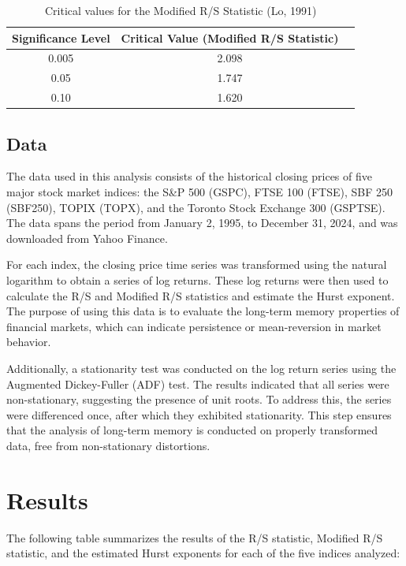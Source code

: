\documentclass[11pt]{extarticle}
\begin{document}
\begin{table}[ht!]
\centering
\begin{tabular}{|c|c|c|}
\hline
\textbf{Significance Level} & \textbf{Critical Value (Modified R/S Statistic)} \\
\hline
0.005 & 2.098\\
0.05 & 1.747\\
0.10 & 1.620\\

\hline
\end{tabular}
\caption{Critical values for the Modified R/S Statistic (Lo, 1991)}
\end{table}



\subsection{Data}

The data used in this analysis consists of the historical closing prices of five major stock market indices: the S\&P 500 (GSPC), FTSE 100 (FTSE), SBF 250 (SBF250), TOPIX (TOPX), and the Toronto Stock Exchange 300 (GSPTSE).
The data spans the period from January 2, 1995, to December 31, 2024, and was downloaded from Yahoo Finance.

For each index, the closing price time series was transformed using the natural logarithm to obtain a series of log returns.
These log returns were then used to calculate the R/S and Modified R/S statistics and estimate the Hurst exponent.
The purpose of using this data is to evaluate the long-term memory properties of financial markets, which can indicate persistence or mean-reversion in market behavior.

Additionally, a stationarity test was conducted on the log return series using the Augmented Dickey-Fuller (ADF) test.
The results indicated that all series were non-stationary, suggesting the presence of unit roots. To address this, the series were differenced once, after which they exhibited stationarity.
This step ensures that the analysis of long-term memory is conducted on properly transformed data, free from non-stationary distortions.

\section{Results}


The following table summarizes the results of the R/S statistic, Modified R/S statistic, and the estimated Hurst exponents for each of the five indices analyzed: \\
\end{document}
